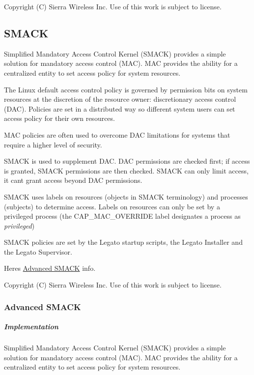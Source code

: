  Copyright (C) Sierra Wireless Inc. Use of this work is subject to license. \hypertarget{basicSecuritySmack}{}\subsection{S\+M\+A\+C\+K}\label{basicSecuritySmack}
Simplified Mandatory Access Control Kernel (S\+M\+A\+C\+K) provides a simple solution for mandatory access control (M\+A\+C). M\+A\+C provides the ability for a centralized entity to set access policy for system resources.

The Linux default access control policy is governed by permission bits on system resources at the discretion of the resource owner\+: discretionary access control (D\+A\+C). Policies are set in a distributed way so different system users can set access policy for their own resources.

M\+A\+C policies are often used to overcome D\+A\+C limitations for systems that require a higher level of security.

S\+M\+A\+C\+K is used to supplement D\+A\+C. D\+A\+C permissions are checked first; if access is granted, S\+M\+A\+C\+K permissions are then checked. S\+M\+A\+C\+K can only limit access, it can\textquotesingle{}t grant access beyond D\+A\+C permissions.

S\+M\+A\+C\+K uses \textquotesingle{}labels\textquotesingle{} on resources (objects in S\+M\+A\+C\+K terminology) and processes (subjects) to determine access. Labels on resources can only be set by a privileged process (the {\ttfamily C\+A\+P\+\_\+\+M\+A\+C\+\_\+\+O\+V\+E\+R\+R\+I\+D\+E} label designates a process as {\itshape privileged})

S\+M\+A\+C\+K policies are set by the Legato startup scripts, the Legato Installer and the Legato Supervisor.

Here\textquotesingle{}s \hyperlink{basicSecuritySmackAdvanced}{Advanced S\+M\+A\+C\+K} info.





Copyright (C) Sierra Wireless Inc. Use of this work is subject to license. \hypertarget{basicSecuritySmackAdvanced}{}\subsubsection{Advanced S\+M\+A\+C\+K}\label{basicSecuritySmackAdvanced}
\hypertarget{basic_security_smack_advanced_basicSecuritySmackAdvanced_implementation}{}\subparagraph{Implementation}\label{basic_security_smack_advanced_basicSecuritySmackAdvanced_implementation}
Simplified Mandatory Access Control Kernel (S\+M\+A\+C\+K) provides a simple solution for mandatory access control (M\+A\+C). M\+A\+C provides the ability for a centralized entity to set access policy for system resources.

